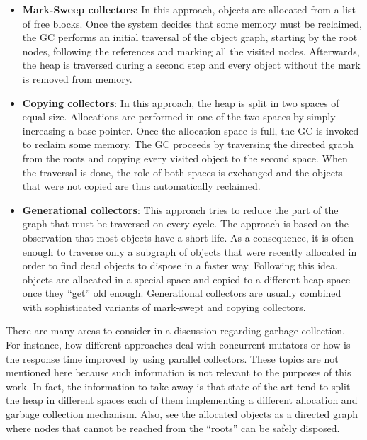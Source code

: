 \begin{itemize}
\item \textbf{Mark-Sweep collectors}: In this approach, objects are allocated from a list of free blocks.
Once the system decides that some memory must be reclaimed, the GC performs an initial traversal of the object graph, starting by the root nodes, following the references and marking all the visited nodes.
Afterwards, the heap is traversed during a second step and every object without the mark is removed from memory.

\item \textbf{Copying collectors}: In this approach, the heap is split in two spaces of equal size.
Allocations are performed in one of the two spaces by simply increasing a base pointer.
Once the allocation space is full, the GC is invoked to reclaim some memory.
The GC proceeds by traversing the directed graph from the roots and copying every visited object to the second space.
When the traversal is done, the role of both spaces is exchanged and the objects that were not copied are thus automatically reclaimed.

\item \textbf{Generational collectors}: This approach tries to reduce the part of the graph that must be traversed on every  cycle.
The approach is based on the observation that most objects have a short life.
As a consequence, it is often enough to traverse only a subgraph of objects that were recently allocated in order to find dead objects to dispose in a faster way.
Following this idea, objects are allocated in a special space and copied to a different heap space once they ``get'' old enough. 
Generational collectors are usually combined with sophisticated variants of mark-swept and copying collectors.
\end{itemize} 

There are many areas to consider in a discussion regarding garbage collection.
For instance, how different approaches deal with concurrent mutators or how is the response time improved by using parallel collectors.
These topics are not mentioned here because such information is not relevant to the purposes of this work.
In fact, the information to take away is that state-of-the-art  tend to split the heap in different spaces each of them implementing a different allocation and garbage collection mechanism.
Also,  see the allocated objects as a directed graph where nodes that cannot be reached from the ``roots'' can be safely disposed.

